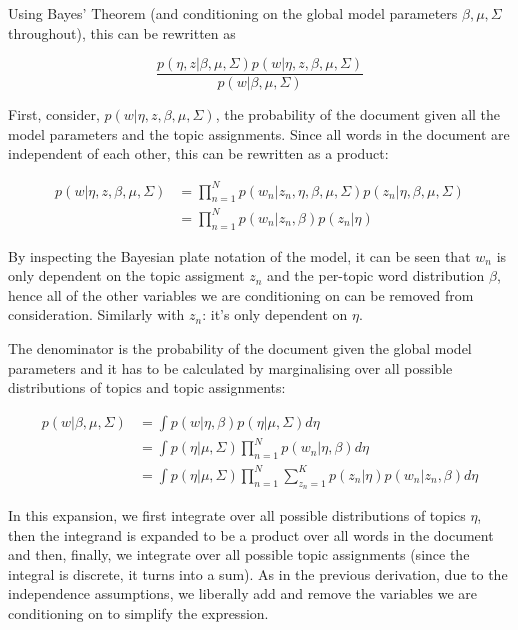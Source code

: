 \documentclass[12pt,a4paper,twoside,openright]{report}
\begin{document}
Using Bayes' Theorem (and conditioning on the global model parameters $\beta, \mu, \Sigma$ throughout), this can be rewritten as 

\begin{equation}
\frac{p(\eta, z | \beta, \mu, \Sigma) p(w | \eta, z, \beta, \mu, \Sigma)}{p(w | \beta, \mu, \Sigma)}
\end{equation}

First, consider, $p(w | \eta, z, \beta, \mu, \Sigma)$, the probability of the document given all the model parameters and the topic assignments. Since all words in the document are independent of each other, this can be rewritten as a product:

\begin{align}
p(w | \eta, z, \beta, \mu, \Sigma) &= \prod\limits_{n=1}^N p(w_n | z_n, \eta, \beta, \mu, \Sigma) p(z_n | \eta, \beta, \mu, \Sigma)\\
& = \prod\limits_{n=1}^N p(w_n | z_n, \beta) p(z_n | \eta)
\end{align}

By inspecting the Bayesian plate notation of the model, it can be seen that $w_n$ is only dependent on the topic assigment $z_n$ and the per-topic word distribution $\beta$, hence all of the other variables we are conditioning on can be removed from consideration. Similarly with $z_n$: it's only dependent on $\eta$.

The denominator is the probability of the document given the global model parameters and it has to be calculated by marginalising over all possible distributions of topics and topic assignments:

\begin{align}
p(w | \beta, \mu, \Sigma) & = \int p(w | \eta, \beta) p(\eta | \mu, \Sigma) d\eta \\
& =\int p(\eta | \mu, \Sigma)  \prod\limits_{n=1}^N p(w_n | \eta, \beta) d\eta \\
& =\int p(\eta | \mu, \Sigma)  \prod\limits_{n=1}^N \sum\limits_{z_n=1}^K p(z_n | \eta) p(w_n | z_n, \beta) d\eta
\end{align}

In this expansion, we first integrate over all possible distributions of topics $\eta$, then the integrand is expanded to be a product over all words in the document and then, finally, we integrate over all possible topic assignments (since the integral is discrete, it turns into a sum). As in the previous derivation, due to the independence assumptions, we liberally add and remove the variables we are conditioning on to simplify the expression.
\end{document}
